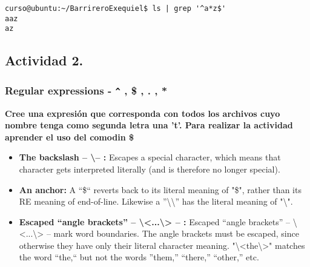\documentclass[a4paper,11pt,spanish]{article} %
\newenvironment{myscriptlisting}
{\begin{list}{}{\setlength{\leftmargin}{1em}}\item\scriptsize\bfseries}
{\end{list}}
\begin{document}
\begin{myscriptlisting}
 \begin{verbatim}
curso@ubuntu:~/BarrireroExequiel$ ls | grep '^a*z$'
aaz
az

 \end{verbatim}
\end{myscriptlisting}

\subsection{Actividad 2.}

\subsubsection{Regular expressions - \texttt{\^} , \$ , . , *}

\textbf{Cree una expresión que corresponda con todos los archivos 
cuyo nombre tenga como segunda letra una 't'.
Para realizar la actividad aprender el uso del comodin \$}\\

\begin{itemize}
 \item \textbf{The backslash -- \textbackslash  -- :} Escapes a special character,
 which means that character gets interpreted literally (and is therefore no longer special).
 \item \textbf{An anchor:} A  ``\$`` reverts back to its literal meaning of "\$",
 rather than its RE meaning of end-of-line. Likewise a ''\textbackslash \textbackslash'' has the literal 
 meaning of "\textbackslash".
 \item \textbf{Escaped ``angle brackets'' -- \textbackslash<...\textbackslash> -- :}  Escaped ``angle
 brackets'' -- \textbackslash<...\textbackslash> -- mark word boundaries.
 The angle brackets must be escaped, since otherwise they have only their literal character meaning.
 "\textbackslash<the\textbackslash>" matches the word ``the,`` but not the words ''them,'' ``there,'' 
 ``other,'' etc.
\end{itemize}

\cite{tldpre}
\end{document}
